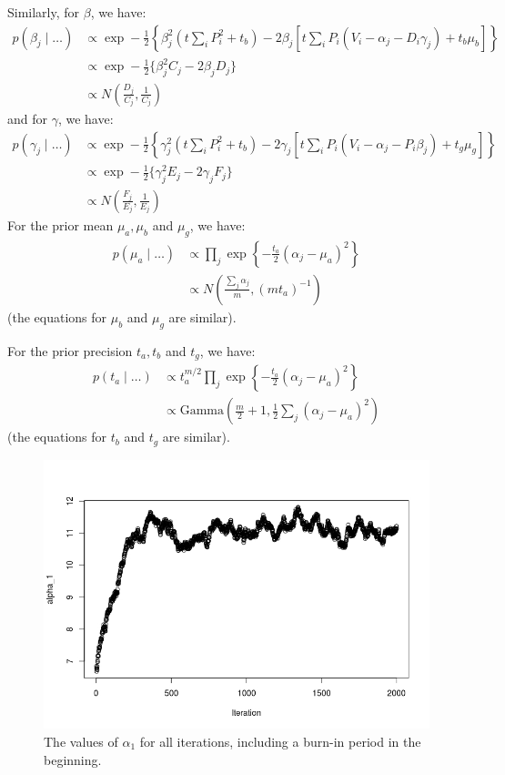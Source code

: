\documentclass{article}
\begin{document}
\begin{enumerate}
Similarly, for \(\beta\), we have:
\begin{align*}
p(\beta_j \mid \ldots) &\propto \exp -\frac{1}{2} \left\lbrace \beta_j^2(t \sum_i P_i^2 + t_b) - 2\beta_j \left[t\sum_i P_i(V_i - \alpha_j - D_i \gamma_j) + t_b \mu_b\right]  \right\rbrace\\
&\propto \exp -\frac{1}{2} \{ \beta_j^2 C_j - 2 \beta_j D_j \}\\
&\propto N\left(\frac{D_j}{C_j} , \frac{1}{C_j}\right)
\end{align*}
and for \(\gamma\), we have:
\begin{align*}
p(\gamma_j \mid \ldots) &\propto \exp -\frac{1}{2} \left\lbrace \gamma_j^2(t \sum_i P_i^2 + t_b) - 2\gamma_j \left[t\sum_i P_i(V_i - \alpha_j - P_i \beta_j) + t_g \mu_g\right]  \right\rbrace\\
&\propto \exp -\frac{1}{2} \{ \gamma_j^2 E_j - 2 \gamma_j F_j \}\\
&\propto N\left(\frac{F_j}{E_j} , \frac{1}{E_j}\right)
\end{align*}
For the prior mean \(\mu_a, \mu_b\) and \(\mu_g\), we have:
\begin{align*}
p(\mu_a \mid \ldots) &\propto \prod_j \exp \left\lbrace -\frac{t_a}{2} (\alpha_j - \mu_a)^2 \right\rbrace\\
&\propto N\left(\frac{\sum_j \alpha_j}{m}, (m t_a)^{-1}\right)
\end{align*}
(the equations for \(\mu_b\) and \(\mu_g\) are similar).

For the prior precision \(t_a, t_b\) and \(t_g\), we have:
\begin{align*}
p(t_a \mid \ldots) &\propto t_a^{m/2} \prod_j \exp \left\lbrace - \frac{t_a}{2} (\alpha_j - \mu_a)^2 \right\rbrace\\
&\propto \mbox{Gamma}\left(\frac{m}{2} + 1, \frac{1}{2} \sum_j (\alpha_j - \mu_a)^2\right)
\end{align*}
(the equations for \(t_b\) and \(t_g\) are similar).

\begin{figure}[h]
\includegraphics[width=\textwidth]{alpha1.jpeg}
\caption{The values of \(\alpha_1\) for all iterations, including a burn-in period in the beginning.}
\end{figure}



\end{enumerate}
\end{document}
